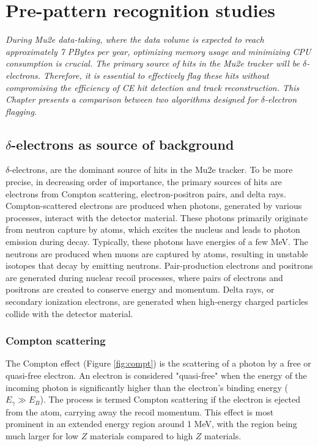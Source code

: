 \chapter{Pre-pattern recognition studies}\label{delta}
\textit{During Mu2e data-taking, 
where the data volume is expected to reach approximately 7 PBytes per year, optimizing 
memory usage and minimizing CPU consumption is crucial. The primary source of hits in the 
Mu2e tracker will be $\delta$-electrons. Therefore, it is essential to effectively flag these 
hits without compromising the efficiency of CE hit detection and track reconstruction. This 
Chapter presents a comparison between two algorithms designed for $\delta$-electron flagging.}

\section{$\delta$-electrons as source of background}

$\delta$-electrons, are the dominant source of hits 
in the Mu2e tracker. To be more precise, in decreasing order 
of importance, the primary sources of hits are electrons 
from Compton scattering, electron-positron pairs, and delta rays.
Compton-scattered electrons are produced 
when photons, generated by various processes, interact with the 
detector material. These photons primarily originate from 
neutron capture by atoms, which excites the nucleus and leads 
to photon emission during decay. Typically, these photons have 
energies of a few MeV. The neutrons are produced when muons are 
captured by atoms, resulting in unstable isotopes that decay by 
emitting neutrons. Pair-production electrons and positrons are 
generated during nuclear recoil processes, where pairs of electrons 
and positrons are created to conserve energy and momentum. Delta rays, 
or secondary ionization electrons, are generated when high-energy 
charged particles collide with the detector material.


\subsection{Compton scattering}
The Compton effect (Figure \ref{fig:compt}) is the 
scattering of a photon by a free or quasi-free electron. 
An electron is considered "quasi-free" when the energy of 
the incoming photon is significantly higher than the 
electron's binding energy ($E_\gamma \gg E_B$). The 
process is termed Compton scattering if the 
electron is ejected from the atom, carrying away the 
recoil momentum. This effect is most prominent in an 
extended energy region around 1 MeV, with the region 
being much larger for low $Z$ materials compared to high $Z$ materials.

